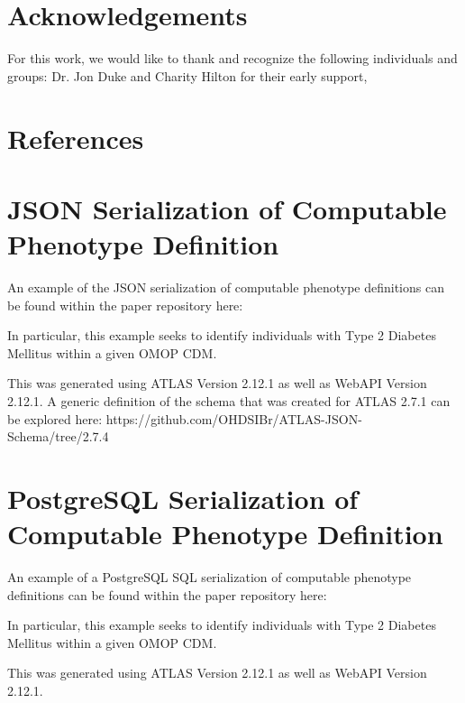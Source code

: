 \documentclass{juliacon}
\begin{document}
\section{Acknowledgements}

For this work, we would like to thank and recognize the following individuals and groups: Dr. Jon Duke and Charity Hilton for their early support, 

\section{References}

\appendix

\section{JSON Serialization of Computable Phenotype Definition}\label{appendix:json}

An example of the JSON serialization of computable phenotype definitions can be found within the paper repository here:

In particular, this example seeks to identify individuals with Type 2 Diabetes Mellitus within a given OMOP CDM.

This was generated using ATLAS Version 2.12.1 as well as 
WebAPI Version 2.12.1.
A generic definition of the schema that was created for ATLAS 2.7.1 can be explored here: https://github.com/OHDSIBr/ATLAS-JSON-Schema/tree/2.7.4

\section{PostgreSQL Serialization of Computable Phenotype Definition}\label{appendix:postgresql}

An example of a PostgreSQL SQL serialization of computable phenotype definitions can be found within the paper repository here:

In particular, this example seeks to identify individuals with Type 2 Diabetes Mellitus within a given OMOP CDM.

This was generated using ATLAS Version 2.12.1 as well as 
WebAPI Version 2.12.1.


\end{document}
